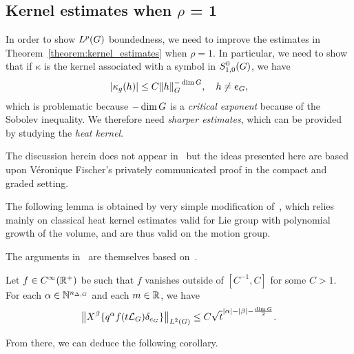 \subsection{Kernel estimates when \texorpdfstring{$\rho$ = 1}{rho = 1}}
\label{subsection:kernel_estimates_revisited}

In order to show $\Lebesgue p \Group$ boundedness,
we need to improve the estimates in Theorem~\ref{theorem:kernel_estimates} when $\rho = 1$.
In particular, we need to show that if $\kappa$ is the kernel associated with a symbol in $\SymbolClass 0 {1, 0}$,
we have
\begin{align*}
    \abs {\kappa_g(h)} \leq C \norm [\Group] h^{-\dim \Group},
    \quad h \neq e_\Group,
\end{align*}
which is problematic because $-\dim \Group$ is a \emph{critical exponent} because of the Sobolev inequality.
We therefore need \emph{sharper estimates},
which can be provided by studying the \emph{heat kernel}.

\begin{remark}
    The discussion herein does not appear in~\cite{Fischer2015,FischerRuzhansky12,FischerRuzhansky16}
    but the ideas presented here are based upon V\'eronique Fischer's privately communicated proof in the compact and graded setting.
\end{remark}

The following lemma is obtained by very simple modification of~\cite[Lemma A.6]{Fischer2015},
which relies mainly on classical heat kernel estimates valid for Lie group with polynomial growth of the volume,
and are thus valid on the motion group.

The arguments in~\cite[Lemma A.6]{Fischer2015} are themselves based on~\cite{FurioliMelziVeneruso06, VaropoulosSaloffCosteCoulhon92}.

\begin{lemma}
\label{lemma:technical_lemma}
    Let $f \in \SmoothFunctions {\R^+}$ be such that $f$ vanishes outside of $[C^{-1}, C]$ for some $C > 1$.
    For each $\alpha \in \N^{\dimDifferenceOperators}$ and each $m \in \R$,
    we have
    \begin{align*}
        \norm [\Lebesgue 2 \Group] {
        \LeftDifferentialOperator \beta \{q^\alpha f(t \Laplacian) \delta_{e_\Group}\}
        }
        \leq C \sqrt t^{\abs \alpha - \abs \beta - \frac {\dim \Group} 2}.
    \end{align*}
\end{lemma}

From there, we can deduce the following corollary.

